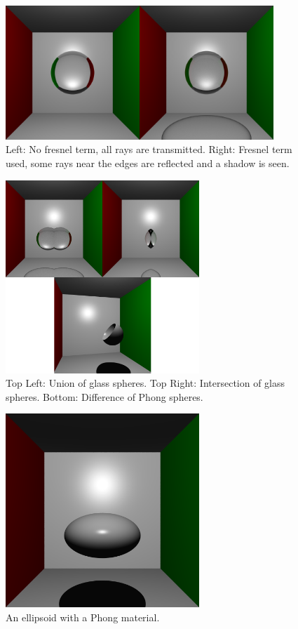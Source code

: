 \documentclass[a4paper]{article}
\begin{document}
\begin{figure}[h]
    \centering
    \includegraphics[width = 0.9\textwidth]{images/fresnelcomp.png}
    \caption{Left: No fresnel term, all rays are transmitted. Right: Fresnel term used, some rays near the edges are reflected and a shadow is seen.}\label{fig:fresnel}
\end{figure}

\begin{figure}[h]
    \centering
    \includegraphics[width = 0.65\textwidth]{images/csgtypes.png}
    \caption{Top Left: Union of glass spheres. Top Right: Intersection of glass spheres. Bottom: Difference of Phong spheres.}\label{fig:csgtypes}
\end{figure}

\begin{figure}[h]
    \centering
    \includegraphics[width = 0.65\textwidth]{images/ellipsoid.png}
    \caption{An ellipsoid with a Phong material.}\label{fig:quadsurface}
\end{figure}
\end{document}
